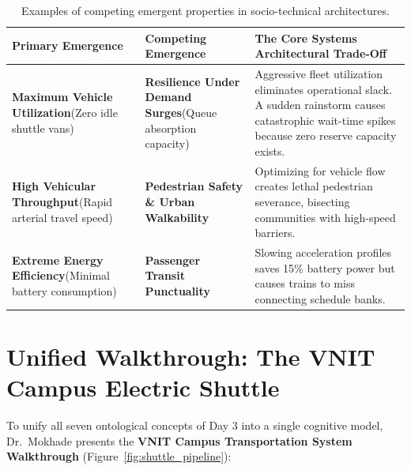 \begin{table}[htbp]
\centering
\small
\renewcommand{\arraystretch}{1.3}
\begin{tabularx}{\textwidth}{p{4.2cm}p{4.2cm}X}
\toprule
\textbf{Primary Emergence} & \textbf{Competing Emergence} & \textbf{The Core Systems Architectural Trade-Off} \\
\midrule
\textbf{Maximum Vehicle Utilization}\newline (Zero idle shuttle vans) &
\textbf{Resilience Under Demand Surges}\newline (Queue absorption capacity) &
Aggressive fleet utilization eliminates operational slack. A sudden rainstorm causes catastrophic wait-time spikes because zero reserve capacity exists. \\
\addlinespace
\textbf{High Vehicular Throughput}\newline (Rapid arterial travel speed) &
\textbf{Pedestrian Safety \& Urban Walkability} &
Optimizing for vehicle flow creates lethal pedestrian severance, bisecting communities with high-speed barriers. \\
\addlinespace
\textbf{Extreme Energy Efficiency}\newline (Minimal battery consumption) &
\textbf{Passenger Transit Punctuality} &
Slowing acceleration profiles saves 15\% battery power but causes trains to miss connecting schedule banks. \\
\bottomrule
\end{tabularx}
\caption{Examples of competing emergent properties in socio-technical architectures.}
\label{tab:competing_emergence}
\end{table}

\section{Unified Walkthrough: The VNIT Campus Electric Shuttle}
\label{sec:vnit_shuttle_walkthrough}

To unify all seven ontological concepts of Day 3 into a single cognitive model, Dr.~Mokhade presents the \textbf{VNIT Campus Transportation System Walkthrough} (Figure~\ref{fig:shuttle_pipeline}):

